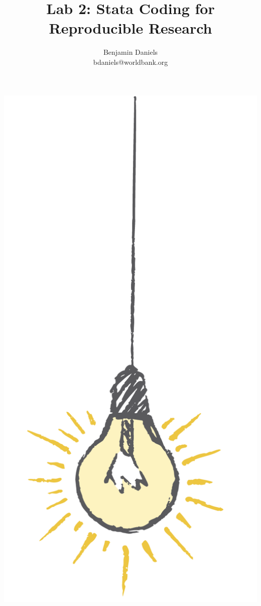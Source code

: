 \documentclass{tufte-handout}
\title{Lab 2: Stata Coding for Reproducible Research}
\author{Benjamin Daniels \\ bdaniels@worldbank.org}
\begin{document}
\maketitle%

\begin{marginfigure}%
  \includegraphics[width=\linewidth]{light.png}
\end{marginfigure}
\end{document}
